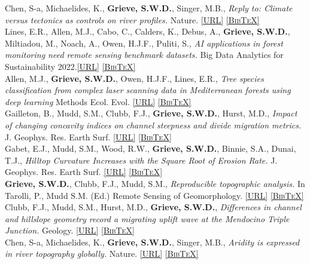 \documentclass[10pt, a4paper]{article}
\newcommand{\doi}[1]{\href{https://dx.doi.org/#1}{\scriptsize\textsc{[URL]}}}
\newcommand{\bib}[1]{\href{https://www.doi2bib.org/bib/#1}{\scriptsize\textsc{[BibTeX]}}}
\newcommand{\paperlinks}[1]{\doi{#1} \bib{#1}}
\newcommand{\student}{\textbf{\textsuperscript{\textdagger}}}
\newcommand{\years}[1]{\marginnote{\scriptsize #1}}
\begin{document}
\years{2022}Chen, S-a, Michaelides, K., \textbf{Grieve, S.W.D.}, Singer, M.B., \textit{Reply to: Climate versus tectonics as controls on river profiles.} Nature. \paperlinks{10.1038/s41586-022-05419-0}\\[0.05cm]

\years{2022}Lines, E.R., Allen, M.J.\student, Cabo, C., Calders, K., Debus, A., \textbf{Grieve, S.W.D.}, Miltiadou, M., Noach, A., Owen, H.J.F., Puliti, S., \textit{AI applications in forest monitoring need remote sensing benchmark datasets.} Big Data Analytics for Sustainability 2022.\paperlinks{10.48550/arXiv.2212.09937}\\[0.05cm]

\years{2022}Allen, M.J.\student, \textbf{Grieve, S.W.D.}, Owen, H.J.F., Lines, E.R., \textit{Tree species classification from complex laser scanning data in Mediterranean forests using deep learning} Methods Ecol. Evol. \paperlinks{10.1111/2041-210X.13981}\\[0.05cm]

\years{2021}Gailleton, B., Mudd, S.M., Clubb, F.J., \textbf{Grieve, S.W.D.}, Hurst, M.D., \textit{Impact of changing concavity indices on channel steepness and divide migration metrics.} J. Geophys. Res. Earth Surf. \paperlinks{10.1029/2020JF006060}\\[0.05cm]

\years{2021}Gabet, E.J., Mudd, S.M., Wood, R.W., \textbf{Grieve, S.W.D.}, Binnie, S.A., Dunai, T.J., \textit{Hilltop Curvature Increases with the Square Root of Erosion Rate.} J. Geophys. Res. Earth Surf. \paperlinks{10.1029/2020JF005858}\\[0.5cm]

\years{2020} \textbf{Grieve, S.W.D.}, Clubb, F.J., Mudd, S.M., \textit{Reproducible topographic analysis.} In Tarolli, P., Mudd S.M. (Ed.) Remote Sensing of Geomorphology. \paperlinks{10.1016/B978-0-444-64177-9.00012-6}\\[0.05cm]

\years{2020} Clubb, F.J., Mudd, S.M., Hurst, M.D., \textbf{Grieve, S.W.D.}, \textit{Differences in channel and hillslope geometry record a migrating uplift wave at the Mendocino Triple Junction.} Geology. \paperlinks{10.1130/G46939.1}\\[0.05cm]

\years{2019}Chen, S-a, Michaelides, K., \textbf{Grieve, S.W.D.}, Singer, M.B., \textit{Aridity is expressed in river topography globally.} Nature. \paperlinks{10.1038/s41586-019-1558-8}\\[0.05cm]
\end{document}
